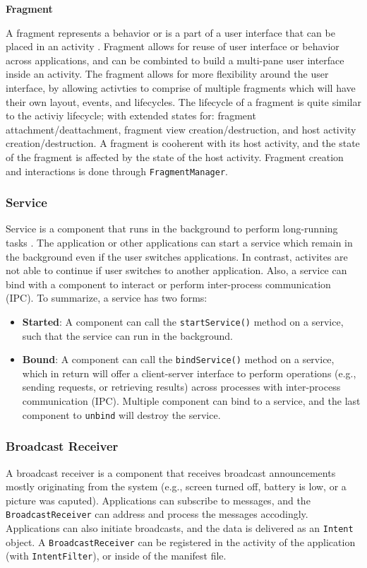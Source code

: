 \noindent \textbf{Fragment}

\noindent A fragment represents a behavior or is a part of a user interface that can be placed in an activity \cite{fragments}. Fragment allows for reuse of user interface or behavior across applications, and can be combinted to build a multi-pane user interface inside an activity. The fragment allows for more flexibility around the user interface, by allowing activties to comprise of multiple fragments which will have their own layout, events, and lifecycles. The lifecycle of a fragment is quite similar to the activiy lifecycle; with extended states for: fragment attachment/deattachment, fragment view creation/destruction, and host activity creation/destruction. A fragment is cooherent with its host activity, and the state of the fragment is affected by the state of the host activity. Fragment creation and interactions is done through \verb|FragmentManager|.  

\subsubsection{Service}
Service is a component that runs in the background to perform long-running tasks \cite{services}. The application or other applications can start a service which remain in the background even if the user switches applications. In contrast, activites are not able to continue if user switches to another application. Also, a service can bind with a component to interact or perform inter-process communication (IPC). To summarize, a service has two forms:
\begin{itemize}
    \item \textbf{Started}: A component can call the \verb|startService()| method on a service, such that the service can run in the background. 
    \item \textbf{Bound}: A component can call the \verb|bindService()| method on a service, which in return will offer a client-server interface to perform operations (e.g., sending requests, or retrieving results) across processes with inter-process communication (IPC). Multiple component can bind to a service, and the last component to \verb|unbind| will destroy the service. 
\end{itemize}

\subsubsection{Broadcast Receiver}
A broadcast receiver is a component that receives broadcast announcements mostly originating from the system (e.g., screen turned off, battery is low, or a picture was caputed). Applications can subscribe to messages, and the \verb|BroadcastReceiver| can address and process the messages accodingly. Applications can also initiate broadcasts, and the data is delivered as an \verb|Intent| object. A \verb|BroadcastReceiver| can be registered in the activity of the application (with \verb|IntentFilter|), or inside of the manifest file. 


